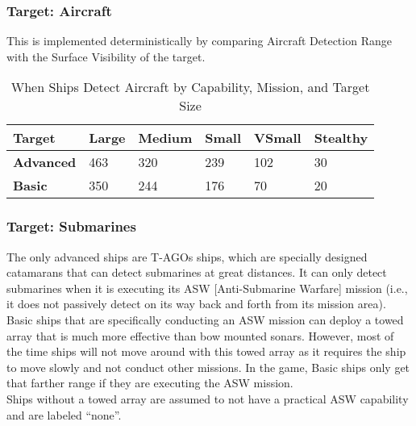 \documentclass{article}
\begin{document}
     \subsubsection{Target: Aircraft}
            \par \noindent This is implemented deterministically by comparing Aircraft Detection Range with the Surface Visibility of the target.
            \begin{table}[h!]
            \centering
            \begin{tabularx}{\textwidth}{|l|X|X|X|X|X|}
            \hline
            \textbf{Target} & \textbf{Large} & \textbf{Medium} & \textbf{Small} & \textbf{VSmall} & \textbf{Stealthy} \\
            \hline
            \textbf{Advanced} & 463 & 320 & 239 & 102 & 30 \\
            \hline
            \textbf{Basic} & 350 & 244 & 176 & 70 & 20 \\
            \hline
            \end{tabularx}
            \caption{When Ships Detect Aircraft by Capability, Mission, and Target Size}
            \label{table:ChineseShipDetectionofAircraft}
            \end{table}

    \subsubsection{Target: Submarines}
        
                    \noindent The only advanced ships are T-AGOs ships, which are specially designed catamarans that can detect submarines at great distances. It can only detect submarines when it is executing its ASW [Anti-Submarine Warfare] mission (i.e., it does not passively detect on its way back and forth from its mission area).\\
                    
                    \noindent Basic ships that are specifically conducting an ASW mission can deploy a towed array that is much more effective than bow mounted sonars. However, most of the time ships will not move around with this towed array as it requires the ship to move slowly and not conduct other missions. In the game, Basic ships only get that farther range if they are executing the ASW mission.\\
                    
                    \noindent Ships without a towed array are assumed to not have a practical ASW capability and are labeled ``none''. \\
                    
\end{document}
